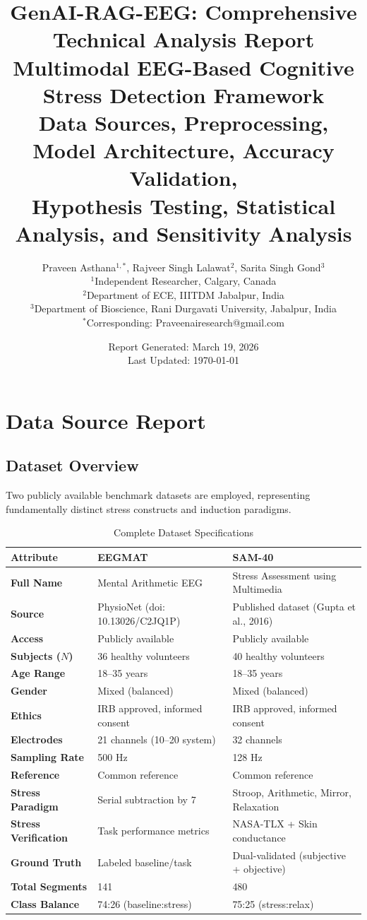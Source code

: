 \documentclass[11pt,a4paper]{article}
\title{\Large\textbf{GenAI-RAG-EEG: Comprehensive Technical Analysis Report}\\[0.5em]
\large Multimodal EEG-Based Cognitive Stress Detection Framework\\[0.3em]
\normalsize Data Sources, Preprocessing, Model Architecture, Accuracy Validation,\\
Hypothesis Testing, Statistical Analysis, and Sensitivity Analysis}
\author{
Praveen Asthana$^{1,*}$, Rajveer Singh Lalawat$^{2}$, Sarita Singh Gond$^{3}$\\[0.3em]
\small $^1$Independent Researcher, Calgary, Canada\\
\small $^2$Department of ECE, IIITDM Jabalpur, India\\
\small $^3$Department of Bioscience, Rani Durgavati University, Jabalpur, India\\
\small $^*$Corresponding: Praveenairesearch@gmail.com
}
\date{Report Generated: March 19, 2026 \\ Last Updated: \today}
\begin{document}
\maketitle
\thispagestyle{fancy}

\tableofcontents
\newpage

\section{Data Source Report}

\subsection{Dataset Overview}

Two publicly available benchmark datasets are employed, representing fundamentally distinct stress constructs and induction paradigms.

\begin{table}[H]
\centering
\caption{Complete Dataset Specifications}
\label{tab:dataset_specs}
\small
\begin{tabular}{p{3.5cm}p{5.5cm}p{5.5cm}}
\toprule
\textbf{Attribute} & \textbf{EEGMAT} & \textbf{SAM-40} \\
\midrule
\textbf{Full Name} & Mental Arithmetic EEG & Stress Assessment using Multimedia \\
\textbf{Source} & PhysioNet (doi: 10.13026/C2JQ1P) & Published dataset (Gupta et al., 2016) \\
\textbf{Access} & Publicly available & Publicly available \\
\textbf{Subjects ($N$)} & 36 healthy volunteers & 40 healthy volunteers \\
\textbf{Age Range} & 18--35 years & 18--35 years \\
\textbf{Gender} & Mixed (balanced) & Mixed (balanced) \\
\textbf{Ethics} & IRB approved, informed consent & IRB approved, informed consent \\
\textbf{Electrodes} & 21 channels (10--20 system) & 32 channels \\
\textbf{Sampling Rate} & 500 Hz & 128 Hz \\
\textbf{Reference} & Common reference & Common reference \\
\textbf{Stress Paradigm} & Serial subtraction by 7 & Stroop, Arithmetic, Mirror, Relaxation \\
\textbf{Stress Verification} & Task performance metrics & NASA-TLX + Skin conductance \\
\textbf{Ground Truth} & Labeled baseline/task & Dual-validated (subjective + objective) \\
\textbf{Total Segments} & 141 & 480 \\
\textbf{Class Balance} & 74:26 (baseline:stress) & 75:25 (stress:relax) \\
\bottomrule
\end{tabular}
\end{table}
\end{document}
